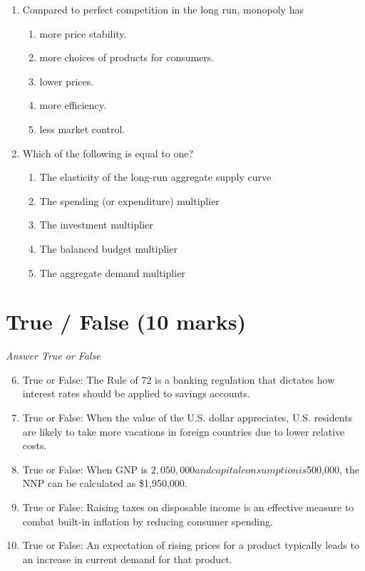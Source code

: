 \documentclass[12pt]{article}
\begin{document}
\begin{enumerate}[label=\arabic*.]
\begin{enumerate}[label=(\alph*)]
\end{enumerate}
\item Compared to perfect competition in the long run, monopoly has
\begin{enumerate}[label=(\alph*)]
    \item more price stability.
    \item more choices of products for consumers.
    \item lower prices.
    \item more efficiency.
    \item less market control.
\end{enumerate}
\item Which of the following is equal to one?
\begin{enumerate}[label=(\alph*)]
    \item The elasticity of the long-run aggregate supply curve
    \item The spending (or expenditure) multiplier
    \item The investment multiplier
    \item The balanced budget multiplier
    \item The aggregate demand multiplier
\end{enumerate}
\end{enumerate}

\section*{True / False (10 marks)}
\textit{Answer True or False}
\begin{enumerate}[label=\arabic*.]
\setcounter{enumi}{5}
\item True or False: The Rule of 72 is a banking regulation that dictates how interest rates should be applied to savings accounts.
\item True or False: When the value of the U.S. dollar appreciates, U.S. residents are likely to take more vacations in foreign countries due to lower relative costs.
\item True or False: When GNP is $2,050,000 and capital consumption is $500,000, the NNP can be calculated as \$1,950,000.
\item True or False: Raising taxes on disposable income is an effective measure to combat built-in inflation by reducing consumer spending.
\item True or False: An expectation of rising prices for a product typically leads to an increase in current demand for that product.
\end{enumerate}
\end{document}
